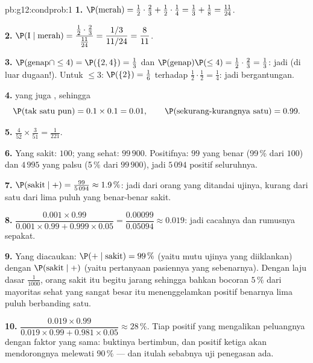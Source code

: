 \begin{solution}{pb:g12:condprob:1}
\textbf{1.} $\P(\text{merah}) = \frac12 \cdot \frac23 + \frac12
\cdot \frac14 = \frac13 + \frac18 = \frac{11}{24}$.

\textbf{2.} $\P(\text{I} \mid \text{merah}) =
\dfrac{\frac12 \cdot \frac23}{\frac{11}{24}} =
\dfrac{1/3}{11/24} = \dfrac{8}{11}$.

\textbf{3.} $\P(\text{genap} \cap \leq 4) = \P(\{2, 4\}) =
\frac13$ dan $\P(\text{genap})\P(\leq 4) = \frac12 \cdot
\frac23 = \frac13$: jadi  (di luar dugaan!). Untuk
$\leq 3$: $\P(\{2\}) = \frac16$ terhadap
$\frac12 \cdot \frac12 = \frac14$: jadi bergantungan.

\textbf{4.}  
yang  juga
, sehingga
\[
\P(\text{tak satu pun}) = 0.1 \times 0.1 = 0.01,
\qquad
\P(\text{sekurang-kurangnya satu}) = 0.99 .
\]

\textbf{5.} $\frac{4}{52} \times \frac{3}{51} =
\frac{1}{221}$.

\textbf{6.} Yang sakit: $100$; yang sehat: $99\,900$. Positifnya:
$99$ yang benar (99\,\% dari $100$) dan $4\,995$ yang palsu (5\,\% dari
$99\,900$), jadi $5\,094$ positif seluruhnya.

\textbf{7.} $\P(\text{sakit} \mid +) = \frac{99}{5\,094}
\approx 1.9\,\%$: jadi dari orang yang ditandai ujinya, kurang dari
satu dari lima puluh yang benar-benar sakit.

\textbf{8.} $\dfrac{0.001 \times 0.99}{0.001 \times 0.99 +
0.999 \times 0.05} = \dfrac{0.00099}{0.05094} \approx 0.019$:
jadi cacahnya dan rumusnya sepakat.

\textbf{9.} Yang diacaukan: $\P(+ \mid \text{sakit}) = 99\,\%$
(yaitu mutu ujinya yang diiklankan) dengan
$\P(\text{sakit} \mid +)$ (yaitu pertanyaan pasiennya yang sebenarnya). Dengan
laju dasar $\frac{1}{1000}$, orang sakit itu begitu jarang sehingga
bahkan bocoran $5\,\%$ dari mayoritas sehat yang sangat besar itu menenggelamkan
positif benarnya lima puluh berbanding satu.

\textbf{10.} $\dfrac{0.019 \times 0.99}{0.019 \times 0.99 +
0.981 \times 0.05} \approx 28\,\%$. Tiap positif yang 
mengalikan peluangnya dengan faktor yang sama: buktinya bertimbun,
dan positif ketiga akan mendorongnya melewati $90\,\%$ --- dan itulah
sebabnya uji penegasan ada.


\end{solution}
